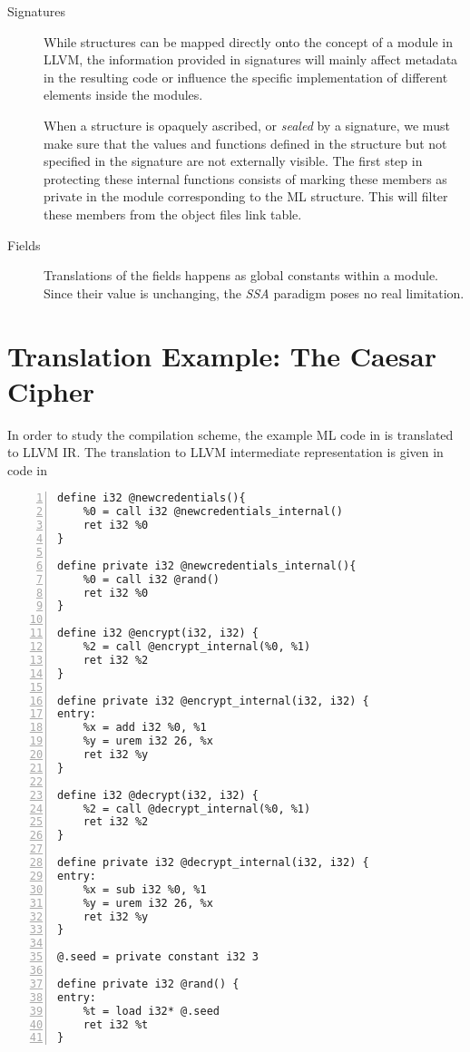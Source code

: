 \documentclass[10pt,a4paper,master=cws, masteroption=ai,english,inputenc=utf8]{kulemt}
\begin{document}
\begin{description}
\item[Signatures]
While structures can be mapped directly onto the concept of a module in LLVM, the information provided in signatures will mainly affect metadata in the resulting code or influence the specific implementation of different elements inside the modules.

When a structure is opaquely ascribed, or \emph{sealed} by a signature, we must make sure that the values and functions defined in the structure but not specified in the signature are not externally visible. The first step in protecting these internal functions consists of marking these members as private in the module corresponding to the ML structure. This will filter these members from the object files link table. %


\item[Fields]
Translations of the fields happens as global constants within a module. Since their value is unchanging, the \emph{SSA} paradigm poses no real limitation.

\end{description}

\section{Translation Example: The Caesar Cipher}
In order to study the compilation scheme, the example ML code in  is translated to LLVM IR. The translation to LLVM intermediate representation is given in code in 

\begin{lstlisting}[frame=single,numbers=left, language={[x86masm]Assembler}, caption=LLVM IR for the example,
label=llvm:Example]
define i32 @newcredentials(){
	%0 = call i32 @newcredentials_internal()
	ret i32 %0
}

define private i32 @newcredentials_internal(){
	%0 = call i32 @rand()
	ret i32 %0
}

define i32 @encrypt(i32, i32) {
	%2 = call @encrypt_internal(%0, %1)
	ret i32 %2
}

define private i32 @encrypt_internal(i32, i32) { 
entry:
	%x = add i32 %0, %1
	%y = urem i32 26, %x 
	ret i32 %y
}

define i32 @decrypt(i32, i32) { 
	%2 = call @decrypt_internal(%0, %1)
	ret i32 %2
}

define private i32 @decrypt_internal(i32, i32) { 
entry:
	%x = sub i32 %0, %1
	%y = urem i32 26, %x 
	ret i32 %y
}

@.seed = private constant i32 3	

define private i32 @rand() {
entry:
	%t = load i32* @.seed
	ret i32 %t
}
\end{lstlisting}
\end{document}
